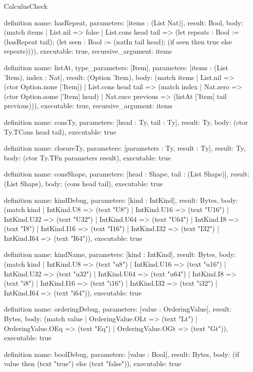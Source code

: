 \begin{lexlean}{CalculusCheck}
\begin{semanticmodule}
definition{
  name: hasRepeat,
  parameters: [items : (List Nat)],
  result: Bool,
  body: (match items
    | List.nil => false
    | List.cons head tail => (let repeats : Bool := (hasRepeat tail); (let seen : Bool := (natIn tail head); (if seen then true else repeats)))),
  executable: true,
  recursive_argument: items
}

definition{
  name: listAt,
  type_parameters: [Item],
  parameters: [items : (List 'Item), index : Nat],
  result: (Option 'Item),
  body: (match items
    | List.nil => (ctor Option.none ['Item])
    | List.cons head tail => (match index
      | Nat.zero => (ctor Option.some ['Item] head)
      | Nat.succ previous => (listAt ['Item] tail previous))),
  executable: true,
  recursive_argument: items
}

definition{
  name: consTy,
  parameters: [head : Ty, tail : Ty],
  result: Ty,
  body: (ctor Ty.TCons head tail),
  executable: true
}

definition{
  name: closureTy,
  parameters: [parameters : Ty, result : Ty],
  result: Ty,
  body: (ctor Ty.TFn parameters result),
  executable: true
}

definition{
  name: consShape,
  parameters: [head : Shape, tail : (List Shape)],
  result: (List Shape),
  body: (cons head tail),
  executable: true
}

definition{
  name: kindDebug,
  parameters: [kind : IntKind],
  result: Bytes,
  body: (match kind
    | IntKind.U8 => (text "U8")
    | IntKind.U16 => (text "U16")
    | IntKind.U32 => (text "U32")
    | IntKind.U64 => (text "U64")
    | IntKind.I8 => (text "I8")
    | IntKind.I16 => (text "I16")
    | IntKind.I32 => (text "I32")
    | IntKind.I64 => (text "I64")),
  executable: true
}

definition{
  name: kindName,
  parameters: [kind : IntKind],
  result: Bytes,
  body: (match kind
    | IntKind.U8 => (text "u8")
    | IntKind.U16 => (text "u16")
    | IntKind.U32 => (text "u32")
    | IntKind.U64 => (text "u64")
    | IntKind.I8 => (text "i8")
    | IntKind.I16 => (text "i16")
    | IntKind.I32 => (text "i32")
    | IntKind.I64 => (text "i64")),
  executable: true
}

definition{
  name: orderingDebug,
  parameters: [value : OrderingValue],
  result: Bytes,
  body: (match value
    | OrderingValue.OLt => (text "Lt")
    | OrderingValue.OEq => (text "Eq")
    | OrderingValue.OGt => (text "Gt")),
  executable: true
}

definition{
  name: boolDebug,
  parameters: [value : Bool],
  result: Bytes,
  body: (if value then (text "true") else (text "false")),
  executable: true
}


\end{semanticmodule}
\end{lexlean}
